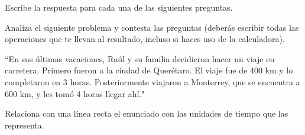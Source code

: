 \documentclass[11pt,addpoints]{exam}
\begin{document}

\begin{questions}
  \question[18] Escribe la respuesta para cada una de las siguientes preguntas.
  \begin{parts}
    
    
    
  \end{parts}

  \question[18] Analiza el siguiente problema y contesta las preguntas (deber\'as escribir todas las operaciones que te llevan al resultado, incluso si haces uso de la calculadora).

  \begin{center}
    \begin{minipage}[c]{\linewidth}
      ``En sus últimas vacaciones, Raúl y su familia decidieron hacer un viaje en carretera.
      Primero fueron a la ciudad de Quer\'etaro. El viaje fue de 400 km y lo completaron en 3 horas.
      Posteriormente viajaron a Monterrey, que se encuentra a 600 km, y les tomó 4 horas llegar ahí."
    \end{minipage}
  \end{center}
  \begin{parts}
    
    
    
  \end{parts}
  \newpage
  \question[18] Relaciona con una l\'inea recta el {\color{cadmiumgreen}enunciado} con las unidades de  {\color{cadmiumorange}tiempo}   que las representa.

  \begin{minipage}{0.6\linewidth}
\end{minipage}
\end{questions}
\end{document}
